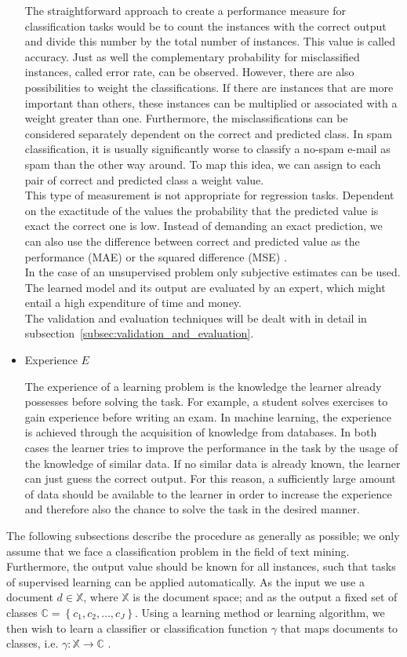 \documentclass[article,type=msc,colorback,accentcolor=tud7b]{tudthesis}
\begin{document}
\begin{itemize}
        The straightforward approach to create a performance measure for classification tasks would be to count the instances with the correct output and divide this number by the total number of instances. This value is called accuracy. Just as well the complementary probability for misclassified instances, called error rate, can be observed. However, there are also possibilities to weight the classifications. If there are instances that are more important than others, these instances can be multiplied or associated with a weight greater than one. Furthermore, the misclassifications can be considered separately dependent on the correct and predicted class. In spam classification, it is usually significantly worse to classify a no-spam e-mail as spam than the other way around. To map this idea, we can assign to each pair of correct and predicted class a weight value. \\
        This type of measurement is not appropriate for regression tasks. Dependent on the exactitude of the values the probability that the predicted value is exact the correct one is low. Instead of demanding an exact prediction, we can also use the difference between correct and predicted value as the performance (MAE) or the squared difference (MSE) \autocite[Chapter~5.8]{Witten2005}. \\
        In the case of an unsupervised problem only subjective estimates can be used. The learned model and its output are evaluated by an expert, which might entail a high expenditure of time and money. \\
        The validation and evaluation techniques will be dealt with in detail in subsection~\ref{subsec:validation_and_evaluation}.
      \item Experience $E$
      
        The experience of a learning problem is the knowledge the learner already possesses before solving the task. For example, a student solves exercises to gain experience before writing an exam. In machine learning, the experience is achieved through the acquisition of knowledge from databases. In both cases the learner tries to improve the performance in the task by the usage of the knowledge of similar data. If no similar data is already known, the learner can just guess the correct output. For this reason, a sufficiently large amount of data should be available to the learner in order to increase the experience and therefore also the chance to solve the task in the desired manner.
    \end{itemize}
    The following subsections describe the procedure as generally as possible; we only assume that we face a classification problem in the field of text mining. Furthermore, the output value should be known for all instances, such that tasks of supervised learning can be applied automatically. As the input we use a document $d\in\mathbb{X}$, where $\mathbb{X}$ is the document space; and as the output a fixed set of classes $\mathbb{C}=\left\{c_{1},c_{2},\dots,c_{J}\right\}$. Using a learning method or learning algorithm, we then wish to learn a classifier or classification function $\gamma$ that maps documents to classes, i.e. $\gamma:\mathbb{X}\rightarrow\mathbb{C}$ \autocite[Chapter~13.1]{Manning2008}.
  
\end{document}
